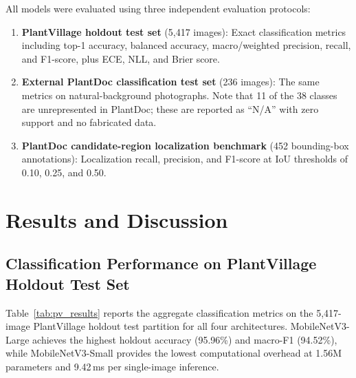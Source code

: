 \documentclass[pdflatex,sn-mathphys-num]{sn-jnl}
\begin{document}
All models were evaluated using three independent evaluation protocols:

\begin{enumerate}
  \item \textbf{PlantVillage holdout test set} (5{,}417 images): Exact classification
        metrics including top-1 accuracy, balanced accuracy, macro/weighted precision,
        recall, and F1-score, plus ECE, NLL, and Brier score.
  \item \textbf{External PlantDoc classification test set} (236 images): The same
        metrics on natural-background photographs. Note that 11 of the 38 classes are
        unrepresented in PlantDoc; these are reported as ``N/A'' with zero support and
        no fabricated data.
  \item \textbf{PlantDoc candidate-region localization benchmark} (452 bounding-box
        annotations): Localization recall, precision, and F1-score at IoU thresholds
        of 0.10, 0.25, and 0.50.
\end{enumerate}


\section{Results and Discussion}
\label{sec:results}

\subsection{Classification Performance on PlantVillage Holdout Test Set}
\label{sec:results_plantvillage}

Table~\ref{tab:pv_results} reports the aggregate classification metrics on the
5{,}417-image PlantVillage holdout test partition for all four architectures.
MobileNetV3-Large achieves the highest holdout accuracy (95.96\%) and macro-F1
(94.52\%), while MobileNetV3-Small provides the lowest computational overhead at
1.56M parameters and 9.42\,ms per single-image inference.
\end{document}
